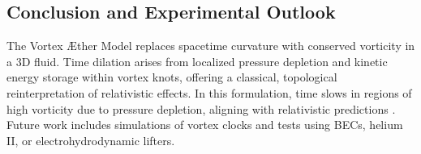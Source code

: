 \subsection{Conclusion and Experimental Outlook}
The Vortex Æther Model replaces spacetime curvature with conserved vorticity in a 3D fluid. Time dilation arises from localized pressure depletion and kinetic energy storage within vortex knots, offering a classical, topological reinterpretation of relativistic effects. In this formulation, time slows in regions of high vorticity due to pressure depletion, aligning with relativistic predictions \cite{fedi2017gravity, simula2020gravitational, winterberg1990maxwell}. Future work includes simulations of vortex clocks and tests using BECs, helium II, or electrohydrodynamic lifters.



